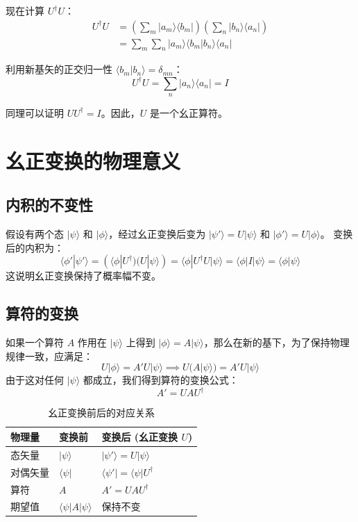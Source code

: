 现在计算 $U^\dagger U$：
\begin{align}
	U^\dagger U &= \left( \sum_m |a_m\rangle \langle b_m| \right) \left( \sum_n |b_n\rangle \langle a_n| \right) \\
	&= \sum_m \sum_n |a_m\rangle \langle b_m | b_n \rangle \langle a_n|
\end{align}

利用新基矢的正交归一性 $\langle b_m | b_n \rangle = \delta_{mn}$：
\begin{equation}
	U^\dagger U = \sum_n |a_n\rangle \langle a_n| = I
\end{equation}

同理可以证明 $UU^\dagger = I$。因此，$U$ 是一个幺正算符。

\section*{幺正变换的物理意义}

\subsection{内积的不变性}
假设有两个态 $|\psi\rangle$ 和 $|\phi\rangle$，经过幺正变换后变为 $|\psi'\rangle = U|\psi\rangle$ 和 $|\phi'\rangle = U|\phi\rangle$。
变换后的内积为：
\begin{equation}
	\langle \phi' | \psi' \rangle = ( \langle \phi | U^\dagger ) ( U | \psi \rangle ) = \langle \phi | U^\dagger U | \psi \rangle = \langle \phi | I | \psi \rangle = \langle \phi | \psi \rangle
\end{equation}
这说明幺正变换保持了概率幅不变。

\subsection{算符的变换}
如果一个算符 $A$ 作用在 $|\psi\rangle$ 上得到 $|\phi\rangle = A|\psi\rangle$，那么在新的基下，为了保持物理规律一致，应满足：
\begin{equation}
	U|\phi\rangle = A' U|\psi\rangle \implies U(A|\psi\rangle) = A' U|\psi\rangle
\end{equation}
由于这对任何 $|\psi\rangle$ 都成立，我们得到算符的变换公式：
\begin{equation}
	A' = U A U^\dagger
\end{equation}

\begin{table}[h]
	\centering
	\begin{tabular}{lll}
		\toprule
		物理量 & 变换前 & 变换后 (幺正变换 $U$) \\
		\midrule
		态矢量 & $|\psi\rangle$ & $|\psi'\rangle = U |\psi\rangle$ \\
		对偶矢量 & $\langle \psi |$ & $\langle \psi' | = \langle \psi | U^\dagger$ \\
		算符 & $A$ & $A' = U A U^\dagger$ \\
		期望值 & $\langle \psi | A | \psi \rangle$ & 保持不变 \\
		\bottomrule
	\end{tabular}
	\caption{幺正变换前后的对应关系}
\end{table}

